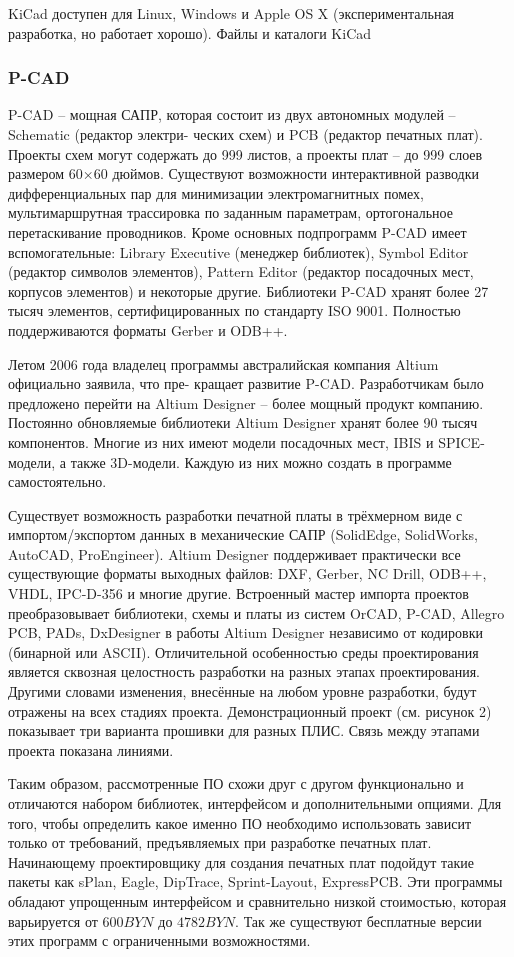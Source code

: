 KiCad доступен для Linux, Windows и Apple OS X (экспериментальная разработка, но работает хорошо).
Файлы и каталоги KiCad
\subsubsection{P-CAD}
P-CAD – мощная САПР, которая состоит из двух автономных модулей – Schematic (редактор электри-
ческих схем) и PCB (редактор печатных плат). Проекты схем могут содержать до 999 листов, а проекты плат –
до 999 слоев размером 60×60 дюймов. Существуют возможности интерактивной разводки дифференциальных
пар для минимизации электромагнитных помех, мультимаршрутная трассировка по заданным параметрам,
ортогональное перетаскивание проводников. Кроме основных подпрограмм P-CAD имеет вспомогательные:
Library Executive (менеджер библиотек), Symbol Editor (редактор символов элементов), Pattern Editor (редактор
посадочных мест, корпусов элементов) и некоторые другие. Библиотеки P-CAD хранят более 27 тысяч
элементов, сертифицированных по стандарту ISO 9001. Полностью поддерживаются форматы Gerber и
ODB++.


Летом 2006 года владелец программы австралийская компания Altium официально заявила, что пре-
кращает развитие P-CAD. Разработчикам было предложено перейти на Altium Designer – более мощный
продукт компанию. Постоянно обновляемые библиотеки Altium Designer хранят более 90 тысяч компонентов.
Многие из них имеют модели посадочных мест, IBIS и SPICE-модели, а также 3D-модели. Каждую из них можно
создать в программе самостоятельно.


Существует возможность разработки печатной платы в трёхмерном виде с импортом/экспортом данных
в механические САПР (SolidEdge, SolidWorks, AutoCAD, ProEngineer). Altium Designer поддерживает
практически все существующие форматы выходных файлов: DXF, Gerber, NC Drill, ODB++, VHDL, IPC-D-356 и
многие другие. Встроенный мастер импорта проектов преобразовывает библиотеки, схемы и платы из систем
OrCAD, P-CAD, Allegro PCB, PADs, DxDesigner в работы Altium Designer независимо от кодировки (бинарной
или ASCII). Отличительной особенностью среды проектирования является сквозная целостность разработки
на разных этапах проектирования. Другими словами изменения, внесённые на любом уровне разработки, будут
отражены на всех стадиях проекта. Демонстрационный проект (см. рисунок 2) показывает три варианта
прошивки для разных ПЛИС. Связь между этапами проекта показана линиями.

Таким образом, рассмотренные ПО схожи друг с другом функционально и отличаются набором
библиотек, интерфейсом и дополнительными опциями. Для того, чтобы определить какое именно ПО
необходимо использовать зависит только от требований, предъявляемых при разработке печатных плат.
Начинающему проектировщику для создания печатных плат подойдут такие пакеты как sPlan, Eagle, DipTrace,
Sprint-Layout, ExpressPCB. Эти программы обладают упрощенным интерфейсом и сравнительно низкой
стоимостью, которая варьируется от $600BYN$ до $4782BYN$. Так же существуют бесплатные версии этих программ с
ограниченными возможностями.


